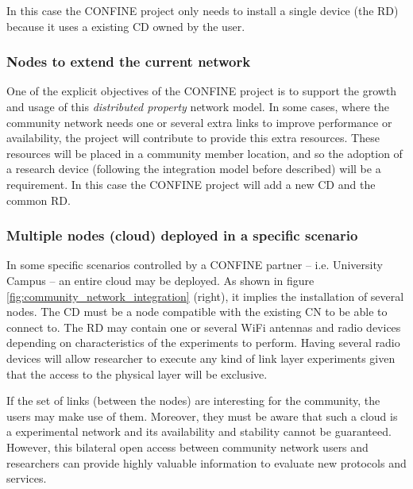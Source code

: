 \documentclass[conference]{IEEEtran}
\begin{document}
In this case the CONFINE project only needs to install a single device (the RD) because it uses a existing
CD owned by the user. 


\subsubsection{Nodes to extend the current network}

One of the explicit objectives of the CONFINE project is to support the growth and usage of this 
\textit{distributed property} network model. In some cases, where the community network needs one or 
several extra links to improve performance or availability, the project will
contribute to provide this extra resources. These resources will be placed in a community 
member location, and so the adoption of a research device (following the integration model before 
described) will be a requirement. In this case the CONFINE project will add a new CD and the common RD.

\subsubsection{Multiple nodes (cloud) deployed in a specific scenario}

In some specific scenarios controlled by a CONFINE partner -- i.e. University Campus -- an entire cloud may be 
deployed. As shown in figure \ref{fig:community_network_integration} (right), it implies the installation of several 
nodes. The CD must be a node compatible with the existing CN to be able to connect to. 
The RD may contain one or several WiFi antennas and radio devices depending on characteristics of the experiments to perform. 
Having several radio devices will allow researcher to execute any kind of link layer experiments given that
the access to the physical layer will be exclusive.

If the set of links (between the nodes) are interesting for the community, the users may make use of them.
Moreover, they must be aware that such a cloud is a experimental network and its availability and stability cannot
be guaranteed. However, this bilateral open access between community network users and researchers can provide
highly valuable information to evaluate new protocols and services.
\end{document}
